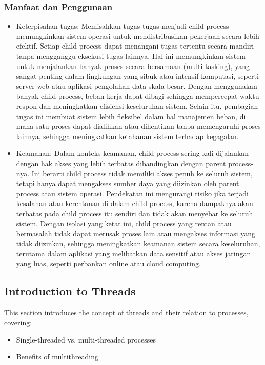 \documentclass[12pt]{article}
\begin{document}
\subsubsection{Manfaat dan Penggunaan}

\begin{itemize}
    \item Keterpisahan tugas: Memisahkan tugas-tugas menjadi child process memungkinkan sistem operasi untuk mendistribusikan pekerjaan secara lebih efektif. Setiap child process dapat menangani tugas tertentu secara mandiri tanpa mengganggu eksekusi tugas lainnya. Hal ini memungkinkan sistem untuk menjalankan banyak proses secara bersamaan (multi-tasking), yang sangat penting dalam lingkungan yang sibuk atau intensif komputasi, seperti server web atau aplikasi pengolahan data skala besar. Dengan menggunakan banyak child process, beban kerja dapat dibagi sehingga mempercepat waktu respon dan meningkatkan efisiensi keseluruhan sistem. Selain itu, pembagian tugas ini membuat sistem lebih fleksibel dalam hal manajemen beban, di mana satu proses dapat dialihkan atau dihentikan tanpa memengaruhi proses lainnya, sehingga meningkatkan ketahanan sistem terhadap kegagalan.

    \item Keamanan: Dalam konteks keamanan, child process sering kali dijalankan dengan hak akses yang lebih terbatas dibandingkan dengan parent process-nya. Ini berarti child process tidak memiliki akses penuh ke seluruh sistem, tetapi hanya dapat mengakses sumber daya yang diizinkan oleh parent process atau sistem operasi. Pendekatan ini mengurangi risiko jika terjadi kesalahan atau kerentanan di dalam child process, karena dampaknya akan terbatas pada child process itu sendiri dan tidak akan menyebar ke seluruh sistem. Dengan isolasi yang ketat ini, child process yang rentan atau bermasalah tidak dapat merusak proses lain atau mengakses informasi yang tidak diizinkan, sehingga meningkatkan keamanan sistem secara keseluruhan, terutama dalam aplikasi yang melibatkan data sensitif atau akses jaringan yang luas, seperti perbankan online atau cloud computing.
\end{itemize}

\subsection{Introduction to Threads}
This section introduces the concept of threads and their relation to processes, covering:
\begin{itemize}
    \item Single-threaded vs. multi-threaded processes
    \item Benefits of multithreading
\end{itemize}
\end{document}
